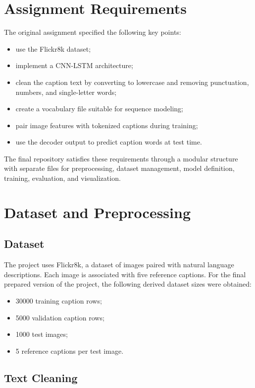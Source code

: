 \documentclass[11pt,a4paper]{article}
\begin{document}
\section{Assignment Requirements}

The original assignment specified the following key points:
\begin{itemize}[leftmargin=*]
    \item use the Flickr8k dataset;
    \item implement a CNN-LSTM architecture;
    \item clean the caption text by converting to lowercase and removing punctuation, numbers, and single-letter words;
    \item create a vocabulary file suitable for sequence modeling;
    \item pair image features with tokenized captions during training;
    \item use the decoder output to predict caption words at test time.
\end{itemize}

The final repository satisfies these requirements through a modular structure with separate files for preprocessing, dataset management, model definition, training, evaluation, and visualization.

\section{Dataset and Preprocessing}

\subsection{Dataset}

The project uses Flickr8k, a dataset of images paired with natural language descriptions. Each image is associated with five reference captions. For the final prepared version of the project, the following derived dataset sizes were obtained:
\begin{itemize}[leftmargin=*]
    \item 30000 training caption rows;
    \item 5000 validation caption rows;
    \item 1000 test images;
    \item 5 reference captions per test image.
\end{itemize}

\subsection{Text Cleaning}
\end{document}
